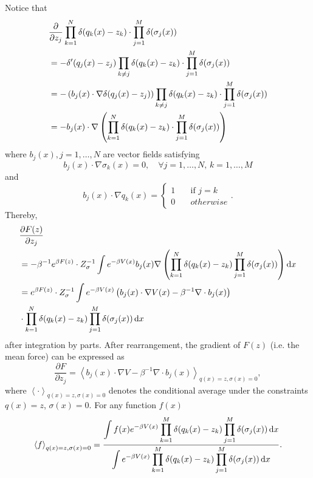 Notice that
\begin{align}
    &\frac{\partial}{\partial z_j}\prod_{k=1}^{N}\delta(q_k(x)-z_k)\cdot \prod_{j=1}^M\delta(\sigma_j(x))\notag\\
    &=-\delta^{\prime}(q_j(x)-z_j)\prod_{k\neq j}\delta(q_k(x)-z_k)\cdot \prod_{j=1}^M\delta(\sigma_j(x))\notag\\
    &=-\left(b_j(x)\cdot\nabla \delta(q_j(x)-z_j)\right)\prod_{k\neq j}\delta(q_k(x)-z_k)\cdot \prod_{j=1}^M\delta(\sigma_j(x))\notag\\
    &=-b_j(x)\cdot \nabla\left(\prod_{k=1}^{N}\delta(q_k(x)-z_k)\cdot \prod_{j=1}^M\delta(\sigma_j(x))\right)
\end{align}
where $b_j(x), j=1,\dots,N$ are vector fields satisfying
\begin{equation}
	b_j(x)\cdot \nabla \sigma_k(x)=0,\quad \forall j=1,\dots,N,\, k=1,\dots,M
\end{equation}
and
\begin{equation}
	b_j(x)\cdot \nabla q_k(x)=\begin{cases}
		1\quad &\text{if } j=k\\
		0\quad &otherwise
	\end{cases}.
\end{equation}
Thereby,
\begin{align}
    &\frac{\partial F(z)}{\partial z_j}\notag\\
    &=-\beta^{-1}e^{\beta F(z)}\cdot Z_\sigma^{-1} \int e^{-\beta V(x)}b_j(x)\nabla\left(\prod_{k=1}^{N}\delta(q_k(x)-z_k)\prod_{j=1}^M\delta(\sigma_j(x))\right)\mathop{}\!\mathrm{d} x\notag\\
    &=e^{\beta F(z)}\cdot Z_\sigma^{-1} \int e^{-\beta V(x)} \left(b_j(x)\cdot \nabla V(x)-\beta^{-1}\nabla\cdot b_j(x)\right)\notag\\
    &\cdot \prod_{k=1}^{N}\delta(q_k(x)-z_k)\prod_{j=1}^M\delta(\sigma_j(x))\mathop{}\!\mathrm{d} x
\end{align}
after integration by parts. After rearrangement, the gradient of $F(z)$ (i.e. the mean force) can be expressed as
\begin{equation}
	\frac{\partial F}{\partial z_j}=\left< b_j(x)\cdot \nabla V-\beta^{-1}\nabla\cdot b_j(x)\right>_{q(x)=z,\sigma(x)=0},
	\label{eq:FEM:ABF:meanforce}
\end{equation}
where $\left<\cdot\right>_{q(x)=z,\sigma(x)=0}$ denotes the conditional average under the constraints $q(x)=z$, $\sigma(x)=0$. For any function $f(x)$
\begin{equation}
	\left<f\right>_{q(x)=z,\sigma(x)=0}=\frac{\displaystyle\int f(x)e^{-\beta V(x)}\prod\limits_{k=1}^{M}\delta(q_k(x)-z_k)\prod\limits_{j=1}^M\delta(\sigma_j(x))\mathop{}\!\mathrm{d} x}{\displaystyle\int e^{-\beta V(x)}\prod\limits_{k=1}^{M}\delta(q_k(x)-z_k)\prod\limits_{j=1}^M\delta(\sigma_j(x))\mathop{}\!\mathrm{d} x}.
	\label{eq:FEM:ABF:expectation}
\end{equation}

